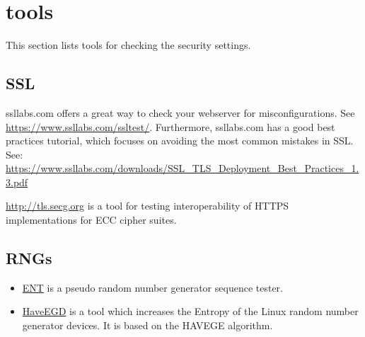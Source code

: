 \section{tools}

This section lists tools for checking the security settings.

\subsection{SSL}

ssllabs.com offers a great way to check your webserver for misconfigurations. See \url{https://www.ssllabs.com/ssltest/}.
Furthermore, ssllabs.com has a good best practices tutorial, which focuses on avoiding the most common mistakes in SSL.
See: \url{https://www.ssllabs.com/downloads/SSL_TLS_Deployment_Best_Practices_1.3.pdf}

\url{http://tls.secg.org} is a tool for testing interoperability of HTTPS implementations for ECC cipher suites.

\subsection{RNGs}

\begin{itemize}
\item \href{http://www.fourmilab.ch/random/}{ENT} is a pseudo random number generator sequence tester.  
\item \href{http://www.issihosts.com/haveged/}{HaveEGD} is a tool which increases the Entropy of the Linux random number generator devices. It is based on the HAVEGE algorithm.
\end{itemize}



